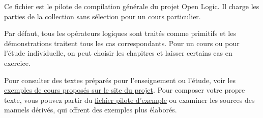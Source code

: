\documentclass[../include/open-logic-part]{subfiles}
\begin{document}
\clearpage

\begin{editorial}
Ce fichier est le pilote de compilation générale du projet Open
Logic. Il charge les parties de la collection sans sélection pour
un cours particulier.

Par défaut, tous les opérateurs logiques sont traités comme primitifs
et les démonstrations traitent tous les cas correspondants. Pour un
cours ou pour l'étude individuelle, on peut choisir les chapitres et
laisser certains cas en exercice.

Pour consulter des textes préparés pour l'enseignement ou l'étude,
voir les \href{http://builds.openlogicproject.org/}{exemples de cours
  proposés sur le site du projet}. Pour composer votre propre texte,
vous pouvez partir du
\href{https://github.com/OpenLogicProject/OpenLogic/tree/master/courses/sample}{fichier
  pilote d'exemple} ou examiner les sources des manuels dérivés, qui
offrent des exemples plus élaborés.
\end{editorial}


















\end{document}

